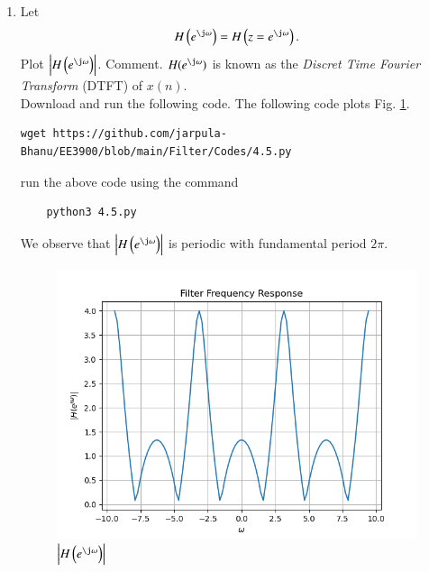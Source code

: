 \documentclass[journal,12pt,twocolumn]{IEEEtran}
\renewcommand\thesection{\arabic{section}}
\begin{document}
\begin{enumerate}[label=\thesection.\arabic*
,ref=\thesection.\theenumi]
\begin{equation}
\label{eq:anun}
a^nu(n) \ztrans \frac{1}{1-az^{-1}} \quad \abs{z} > \abs{a}
\end{equation}
\solution \begin{align}
	a^nu(n) &\ztrans \sum_{n=0}^\infty (az^{-1})^n\\
	& =\frac{1}{1-az^{-1}} \quad \abs{z} > \abs{a}
\end{align}
%
\item 
Let
\begin{equation}
H\brak{e^{\j \omega}} = H\brak{z = e^{\j \omega}}.
\end{equation}
Plot $\abs{H\brak{e^{\j \omega}}}$.  Comment.  $H(e^{\j \omega})$ is
known as the {\em Discret Time Fourier Transform} (DTFT) of $x(n)$.
\\
\solution Download and run the following code. The following code plots Fig. \ref{fig:dtft}.
\begin{lstlisting}
wget https://github.com/jarpula-Bhanu/EE3900/blob/main/Filter/Codes/4.5.py
\end{lstlisting}
run the above code using the command 
\begin{lstlisting}
	python3 4.5.py
\end{lstlisting}
We observe that $\abs{H\brak{e^{\j \omega}}}$ is periodic with fundamental period $2\pi$.
\begin{figure}[!ht]
\centering
\includegraphics[width=\columnwidth]{./figs/4.5.png}
\caption{$\abs{H\brak{e^{\j\omega}}}$}
\label{fig:dtft}
\end{figure}


\end{enumerate}
\end{document}
